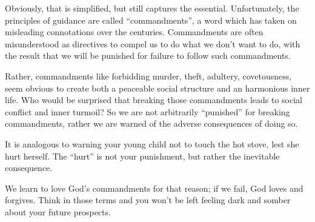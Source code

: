 Obviously, that is simplified, but still captures the essential. Unfortunately, the principles of guidance are called
“commandments”, a word which has taken on misleading connotations over the centuries. Commandments are often
misunderstood as directives to compel us to do what we don't want to do, with the result that we will be
punished for failure to follow such commandments.

Rather, commandments like forbidding murder, theft, adultery, covetousness, seem obvious to create both a peaceable
social structure and an harmonious inner life. Who would be surprised that breaking those commandments leads to social
conflict and inner turmoil? So we are not arbitrarily “punished” for breaking commandments, rather we are warned of the
adverse consequences of doing so.

It is analogous to warning your young child not to touch the hot stove, lest she hurt herself. The “hurt” is not your
punishment, but rather the inevitable consequence.

We learn to love God's commandments for that reason; if we fail, God loves and forgives. Think in those
terms and you won't be left feeling dark and somber about your future prospects.

